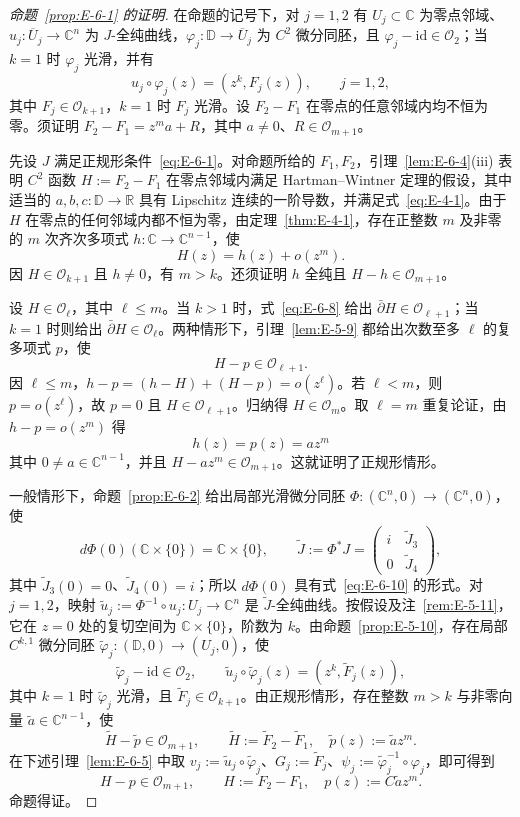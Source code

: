 \begin{proof}[命题~\ref{prop:E-6-1} 的证明]
在命题的记号下，对 $j=1,2$ 有 $U_j\subset\mathbb C$ 为零点邻域、$u_j:\overline U_j\to\mathbb C^n$ 为 $J$-全纯曲线，$\varphi_j:\mathbb D\to\overline U_j$ 为 $C^2$ 微分同胚，且 $\varphi_j-\mathrm{id}\in\mathcal O_2$；当 $k=1$ 时 $\varphi_j$ 光滑，并有
\[
  u_j\circ\varphi_j(z)=(z^k,F_j(z)),\qquad j=1,2,
\]
其中 $F_j\in\mathcal O_{k+1}$，$k=1$ 时 $F_j$ 光滑。设 $F_2-F_1$ 在零点的任意邻域内均不恒为零。须证明 $F_2-F_1=z^ma+R$，其中 $a\ne0$、$R\in\mathcal O_{m+1}$。

先设 $J$ 满足正规形条件~\eqref{eq:E-6-1}。对命题所给的 $F_1,F_2$，引理~\ref{lem:E-6-4}(iii) 表明 $C^2$ 函数 $H:=F_2-F_1$ 在零点邻域内满足 Hartman--Wintner 定理的假设，其中适当的 $a,b,c:\mathbb D\to\mathbb R$ 具有 Lipschitz 连续的一阶导数，并满足式~\eqref{eq:E-4-1}。由于 $H$ 在零点的任何邻域内都不恒为零，由定理~\ref{thm:E-4-1}，存在正整数 $m$ 及非零的 $m$ 次齐次多项式 $h:\mathbb C\to\mathbb C^{n-1}$，使
\[
  H(z)=h(z)+o(z^m).
\]
因 $H\in\mathcal O_{k+1}$ 且 $h\ne0$，有 $m>k$。还须证明 $h$ 全纯且 $H-h\in\mathcal O_{m+1}$。

设 $H\in\mathcal O_\ell$，其中 $\ell\le m$。当 $k>1$ 时，式~\eqref{eq:E-6-8} 给出 $\bar\partial H\in\mathcal O_{\ell+1}$；当 $k=1$ 时则给出 $\bar\partial H\in\mathcal O_\ell$。两种情形下，引理~\ref{lem:E-5-9} 都给出次数至多 $\ell$ 的复多项式 $p$，使
\[
  H-p\in\mathcal O_{\ell+1}.
\]
因 $\ell\le m$，$h-p=(h-H)+(H-p)=o(z^\ell)$。若 $\ell<m$，则 $p=o(z^\ell)$，故 $p=0$ 且 $H\in\mathcal O_{\ell+1}$。归纳得 $H\in\mathcal O_m$。取 $\ell=m$ 重复论证，由 $h-p=o(z^m)$ 得
\[
  h(z)=p(z)=az^m
\]
其中 $0\ne a\in\mathbb C^{n-1}$，并且 $H-az^m\in\mathcal O_{m+1}$。这就证明了正规形情形。

一般情形下，命题~\ref{prop:E-6-2} 给出局部光滑微分同胚 $\Phi:(\mathbb C^n,0)\to(\mathbb C^n,0)$，使
\[
  d\Phi(0)(\mathbb C\times\{0\})=\mathbb C\times\{0\},
  \qquad
  \widetilde J:=\Phi^*J
      =\begin{pmatrix}i&\widetilde J_3\\0&\widetilde J_4\end{pmatrix},
\]
其中 $\widetilde J_3(0)=0$、$\widetilde J_4(0)=i$；所以 $d\Phi(0)$ 具有式~\eqref{eq:E-6-10} 的形式。对 $j=1,2$，映射 $\widetilde u_j:=\Phi^{-1}\circ u_j:U_j\to\mathbb C^n$ 是 $\widetilde J$-全纯曲线。按假设及注~\ref{rem:E-5-11}，它在 $z=0$ 处的复切空间为 $\mathbb C\times\{0\}$，阶数为 $k$。由命题~\ref{prop:E-5-10}，存在局部 $C^{k,1}$ 微分同胚 $\widetilde\varphi_j:(\mathbb D,0)\to(U_j,0)$，使
\[
  \widetilde\varphi_j-\mathrm{id}\in\mathcal O_2,
  \qquad
  \widetilde u_j\circ\widetilde\varphi_j(z)
   =(z^k,\widetilde F_j(z)),
\]
其中 $k=1$ 时 $\widetilde\varphi_j$ 光滑，且 $\widetilde F_j\in\mathcal O_{k+1}$。由正规形情形，存在整数 $m>k$ 与非零向量 $\widetilde a\in\mathbb C^{n-1}$，使
\[
  \widetilde H-\widetilde p\in\mathcal O_{m+1},\qquad
  \widetilde H:=\widetilde F_2-\widetilde F_1,\quad
  \widetilde p(z):=\widetilde a z^m.
\]
在下述引理~\ref{lem:E-6-5} 中取 $v_j:=\widetilde u_j\circ\widetilde\varphi_j$、$G_j:=\widetilde F_j$、$\psi_j:=\widetilde\varphi_j^{-1}\circ\varphi_j$，即可得到
\[
  H-p\in\mathcal O_{m+1},\qquad
  H:=F_2-F_1,\quad p(z):=C\widetilde a z^m.
\]
命题得证。
\end{proof}

